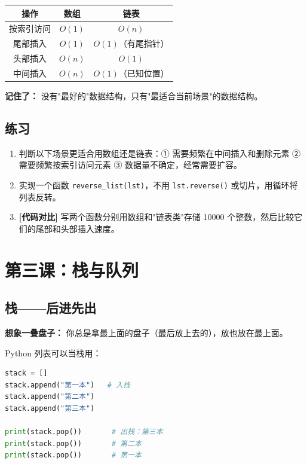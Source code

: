 \documentclass[a4paper,12pt]{ctexart}
\begin{document}
\begin{center}
\begin{tabular}{|c|c|c|}
\hline
\textbf{操作} & \textbf{数组} & \textbf{链表} \\ \hline
按索引访问 & $O(1)$ & $O(n)$ \\ \hline
尾部插入 & $O(1)$ & $O(1)$（有尾指针） \\ \hline
头部插入 & $O(n)$ & $O(1)$ \\ \hline
中间插入 & $O(n)$ & $O(1)$（已知位置） \\ \hline
\end{tabular}
\end{center}

\textbf{记住了：} 没有"最好的"数据结构，只有"最适合当前场景"的数据结构。

\subsection*{练习}

\begin{enumerate}
  \item 判断以下场景更适合用数组还是链表：① 需要频繁在中间插入和删除元素 ② 需要频繁按索引访问元素 ③ 数据量不确定，经常需要扩容。
  \item 实现一个函数 \texttt{reverse\_list(lst)}，不用 \texttt{lst.reverse()} 或切片，用循环将列表反转。
  \item \textbf{[代码对比]} 写两个函数分别用数组和"链表类"存储 10000 个整数，然后比较它们的尾部和头部插入速度。
\end{enumerate}

\section*{第三课：栈与队列}

\subsection*{栈——后进先出}

\textbf{想象一叠盘子：} 你总是拿最上面的盘子（最后放上去的），放也放在最上面。

Python 列表可以当栈用：

\begin{lstlisting}[language=Python]
stack = []
stack.append("第一本")   # 入栈
stack.append("第二本")
stack.append("第三本")

print(stack.pop())       # 出栈：第三本
print(stack.pop())       # 第二本
print(stack.pop())       # 第一本
\end{lstlisting}
\end{document}
